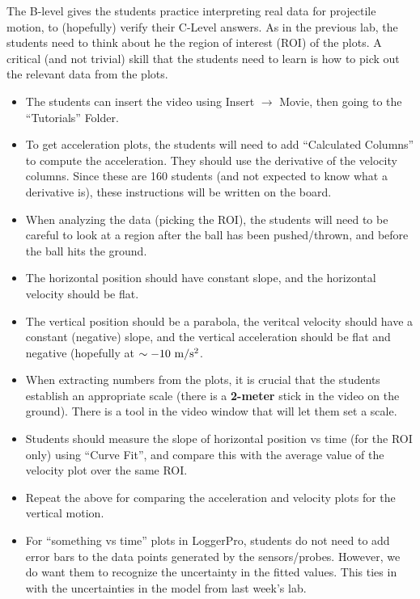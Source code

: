 \documentclass[fleqn,letterpaper]{article}
\begin{document}
The B-level gives the students practice interpreting real data for projectile motion, to (hopefully) verify their C-Level answers.  As in the previous lab, the students need to think about he the region of interest (ROI) of the plots.  A critical (and not trivial) skill that the students need to learn is how to pick out the relevant data from the plots.

\begin{itemize}
\item{The students can insert the video using Insert $\rightarrow$ Movie, then going to the ``Tutorials'' Folder.}
\item{To get acceleration plots, the students will need to add ``Calculated Columns'' to compute the acceleration.  They should use the derivative of the velocity columns.  Since these are 160 students (and not expected to know what a derivative is), these instructions will be written on the board.}
\item{When analyzing the data (picking the ROI), the students will need to be careful to look at a region after the ball has been pushed/thrown, and before the ball hits the ground.}
\item{The horizontal position should have constant slope, and the horizontal velocity should be flat.}
\item{The vertical position should be a parabola, the veritcal velocity should have a constant (negative) slope, and the vertical acceleration should be flat and negative (hopefully at $\sim-10~{\rm m/s^2}$.}
\item{When extracting numbers from the plots, it is crucial that the students establish an appropriate scale (there is a \textbf{2-meter} stick in the video on the ground).  There is a tool in the video window that will let them set a scale.}
\item{Students should measure the slope of horizontal position vs time (for the ROI only) using ``Curve Fit'', and compare this with the average value of the velocity plot over the same ROI.}
\item{Repeat the above for comparing the acceleration and velocity plots for the vertical motion.}
\item{For ``something vs time'' plots in LoggerPro, students do not need to add error bars to the data points generated by the sensors/probes.  However, we do want them to recognize the uncertainty in the fitted values.  This ties in with the uncertainties in the model from last week's lab.}
\end{itemize}
\end{document}
